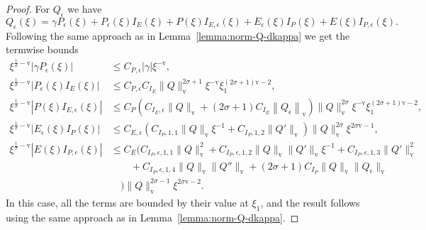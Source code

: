 \documentclass[11pt]{article}
\newcommand{\normv}{\mathrm{v}}
\begin{document}
\begin{proof}
  For \(Q_\epsilon\) we have
  \begin{equation*}
    Q_{\epsilon}(\xi)
    = \gamma P_{\epsilon}(\xi)
    + P_{\epsilon}(\xi)I_{E}(\xi)
    + P(\xi)I_{E,\epsilon}(\xi)
    + E_{\epsilon}(\xi)I_{P}(\xi)
    + E(\xi)I_{P,\epsilon}(\xi).
  \end{equation*}
  Following the same approach as in Lemma~\ref{lemma:norm-Q-dkappa} we
  get the termwise bounds
  \begin{align*}
    \xi^{\frac{1}{\sigma} - \normv}\left|\gamma P_{\epsilon}(\xi)\right|
    &\leq C_{P,\epsilon}|\gamma|\xi^{-\normv},\\
    \xi^{\frac{1}{\sigma} - \normv}\left|P_{\epsilon}(\xi)I_{E}(\xi)\right|
    &\leq C_{P,\epsilon}C_{I_{E}}
      \|Q\|_{\normv}^{2\sigma + 1}\xi^{-\normv}\xi_{1}^{(2\sigma + 1)\normv - 2},\\
    \xi^{\frac{1}{\sigma} - \normv}\left|P(\xi)I_{E,\epsilon}(\xi)\right|
    &\leq C_{P}
      (
      C_{I_{E},\epsilon}\|Q\|_{\normv}
      + (2\sigma + 1)C_{I_{E}}\left\|Q_{\epsilon}\right\|_{\normv}
      )\|Q\|_{\normv}^{2\sigma}\xi^{-\normv}\xi_{1}^{(2\sigma + 1)\normv - 2},\\
    \xi^{\frac{1}{\sigma} - \normv}\left|E_{\epsilon}(\xi)I_{P}(\xi)\right|
    &\leq C_{E,\epsilon}
      (C_{I_{P},1,1}\|Q\|_{\normv}\xi^{-1} + C_{I_{P},1,2}\|Q'\|_{\normv})\|Q\|_{\normv}^{2\sigma}
      \xi^{2\sigma\normv - 1},\\
    \xi^{\frac{1}{\sigma} - \normv}\left|E(\xi)I_{P,\epsilon}(\xi)\right|
    &\leq C_{E}\Big(C_{I_{P},\epsilon,1,1}\|Q\|_{\normv}^{2}
    + C_{I_{P},\epsilon,1,2}\|Q\|_{\normv}\|Q'\|_{\normv}\xi^{-1}
      + C_{I_{P},\epsilon,1,3}\|Q'\|_{\normv}^{2}\\
    &\qquad+ C_{I_{P},\epsilon,1,4}\|Q\|_{\normv}\|Q''\|_{\normv}
      + (2\sigma + 1)C_{I_{P}}\|Q\|_{\normv}\|Q_{\epsilon}\|_{\normv}\\
    &\quad\Big)\|Q\|_{\normv}^{2\sigma - 1}\xi^{2\sigma\normv - 2}.
  \end{align*}
  In this case, all the terms are bounded by their value at
  \(\xi_{1}\), and the result follows using the same approach as in
  Lemma~\ref{lemma:norm-Q-dkappa}.
\end{proof}
\end{document}
